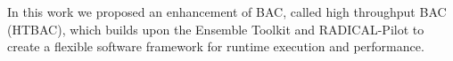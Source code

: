 
In this work we proposed an enhancement of BAC, called high throughput BAC
(HTBAC), which builds upon the Ensemble Toolkit and RADICAL-Pilot to create a
flexible software framework for runtime execution and performance.
